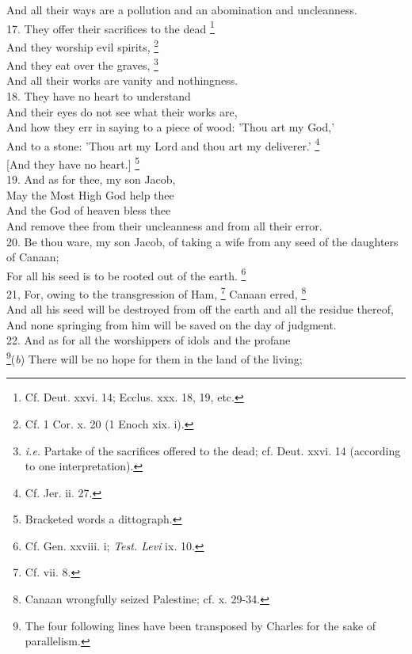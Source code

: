 And all their ways are a pollution and an abomination and uncleanness.\\
17. They offer their sacrifices to the dead \footnote{Cf. Deut. xxvi. 14; Ecclus. xxx. 18, 19, etc.}\\
And they worship evil spirits, \footnote{Cf. 1 Cor. x. 20 (1 Enoch xix. i).}\\
And they eat over the graves, \footnote{\emph{i.e.} Partake of the sacrifices offered to the dead; cf. Deut. xxvi. 14 (according to one interpretation).}\\
And all their works are vanity and nothingness.\\
18. They have no heart to understand\\
And their eyes do not see what their works are,\\
And how they err in saying to a piece of wood: 'Thou art my God,'\\
And to a stone: 'Thou art my Lord and thou art my deliverer.' \footnote{Cf. Jer. ii. 27.}\\
{}[And they have no heart.] \footnote{Bracketed words a dittograph.}\\
19. And as for thee, my son Jacob,\\
May the Most High God help thee\\
And the God of heaven bless thee\\
And remove thee from their uncleanness and from all their error.\\
20. Be thou ware, my son Jacob, of taking a wife from any seed of the daughters of Canaan;\\
For all his seed is to be rooted out of the earth. \footnote{Cf. Gen. xxviii. i; \emph{Test. Levi} ix. 10.}\\
21, For, owing to the transgression of Ham, \footnote{Cf. vii. 8.} Canaan erred, \footnote{Canaan wrongfully seized Palestine; cf. x. 29-34.}\\
And all his seed will be destroyed from off the earth and all the residue thereof,\\
And none springing from him will be saved on the day of judgment.\\
22. And as for all the worshippers of idols and the profane\\
\footnote{The four following lines have been transposed by Charles for the sake of parallelism.}(\emph{b}) There will be no hope for them in the land of the living;

